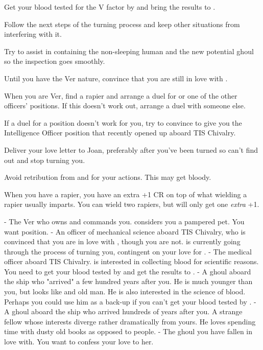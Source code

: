 \documentclass[char]{guildcamp4}
\begin{document}
\begin{itemz}[Goals]
	\item Get your blood tested for the V factor by \cVthree{} and bring the results to \cVtwo{}.
	\item Follow the next steps of the turning process and keep other situations from interfering with it.
	\item Try to assist in containing the non-sleeping human and the new potential ghoul so the inspection goes smoothly.
	\item Until you have the Ver nature, convince \cVtwo{} that you are still in love with \cVtwo{\them}.
	\item When you are Ver, find a rapier and arrange a duel for \cVone{} or one of the other officers' positions. If this doesn't work out, arrange a duel with someone else.
	\item If a duel for a position doesn't work for you, try to convince \cVone{} to give you the Intelligence Officer position that recently opened up aboard TIS Chivalry.
	\item Deliver your love letter to Joan, preferably after you've been turned so \cVtwo{} can't find out and stop turning you.
	\item Avoid retribution from \cVone{} and \cVtwo{} for your actions. This may get bloody.
\end{itemz} 

\begin{itemz}[Notes]
	\item When you have a rapier, you have an extra +1 CR on top of what wielding a rapier usually imparts. You can wield two rapiers, but will only get one {\em extra} +1.
\end{itemz}

\begin{contacts}
	\contact{\cVone{}} - The Ver who owns and commands you. \cVone{\they} considers you a pampered pet. You want \cVone{\their} position.
	\contact{\cVtwo{}} - An officer of mechanical science aboard TIS Chivalry, who is convinced that you are in love with \cVtwo{\them}, though you are not. \cVtwo{} is currently going through the process of turning you, contingent on your love for \cVtwo{\them}.
	\contact{\cVthree{}} - The medical officer aboard TIS Chivalry. \cVthree{\They} is interested in collecting blood for scientific reasons. You need to get your blood tested by \cVthree{\them} and get the results to \cVtwo{}.
	\contact{\cJames{}} - A ghoul aboard the ship who "arrived" a few hundred years after you. He is much younger than you, but looks like and old man. He is also interested in the science of blood. Perhaps you could use him as a back-up if you can't get your blood tested by \cVthree{}.
	\contact{\cRasputin{}} - A ghoul aboard the ship who arrived hundreds of years after you. A strange fellow whose interests diverge rather dramatically from yours. He loves spending time with dusty old books as opposed to people.
	\contact{\cJoan{}} - The ghoul you have fallen in love with. You want to confess your love to her. 
\end{contacts}
\end{document}
